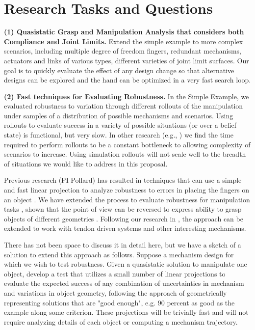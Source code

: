 \section{Research Tasks and Questions}

\smallskip\noindent
{\bf (1) Quasistatic Grasp and Manipulation Analysis that considers both Compliance and Joint Limits.}  Extend the simple example to more complex scenarios, including multiple degree of freedom fingers, redundant mechanisms, actuators and links of various types, different varieties of joint limit surfaces.   Our goal is to quickly evaluate the effect of any design change so that alternative designs can be explored and the hand can be optimized in a very fast search loop.

\smallskip\noindent
{\bf (2) Fast techniques for Evaluating Robustness.}   In the Simple Example, we evaluated robustness to variation through different rollouts of the manipulation under samples of a distribution of possible mechanisms and scenarios.   Using rollouts to evaluate success in a variety of possible situations (or over a belief state) is functional, but very slow.   In other research (e.g., \cite{koval2016pre}) we find the time required to perform rollouts to be a constant bottleneck to allowing complexity of scenarios to increase.   Using simulation rollouts will not scale well to the breadth of situations we would like to address in this proposal.

Previous research (PI Pollard) has resulted in techniques that can use a simple and fast linear projection to analyze robustness to errors in placing the fingers on an object \cite{pollard2004closure}.   We have extended the process to evaluate robustness for manipulation tasks \cite{Pollard:WAFR02}, shown that the point of view can be reversed to express ability to grasp objects of different geometries \cite{pollard20045}.   Following our research in \cite{Li:graspDB07}, the approach can be extended to work with tendon driven systems and other interesting mechanisms.

There has not been space to discuss it in detail here, but we have a sketch of a solution to extend this approach as follows.    Suppose a mechanism design for which we wish to test robustness.    Given a quasistatic  solution to manipulate one object, develop a test that utilizes a small number of linear projections to evaluate the expected success of any combination of uncertainties in mechanism and variations in object geometry, following the approach of geometrically representing solutions that are "good enough", e.g. 90 percent as good as the example along some criterion.   These projections will be trivially fast and will not require analyzing details of each object or computing a mechanism trajectory.

